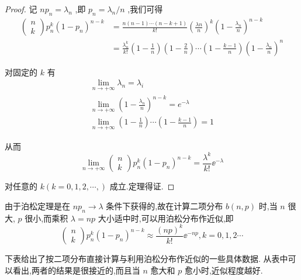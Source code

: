 \begin{proof}
	记 $ n p_{n}=\lambda_{n} $ ,即 $ p_{n}=\lambda_{n} / n $ ,我们可得
	\[
	\begin{array}{ll}
	{\left( 
		\begin{array}{l}
		{n} \\ 
		{k}
		\end{array}
		\right) p_{n}^{k}\left(1-p_{n}\right)^{n-k}} & {=\frac{n(n-1) \cdots(n-k+1)}{k !}
		\left(\frac{\lambda n}{n}\right)^{k}
		\left(1-\frac{\lambda_{n}}{n}\right)^{n-k}} \\
	{} & {=\frac{\lambda_{n}^{k}}{k !}
		\left(1-\frac{1}{n}\right)
		\left(1-\frac{2}{n}\right)
		\cdots
		\left(1-\frac{k-1}{n}\right)
		\left(1-\frac{\lambda_{n}}{n}\right)^{n}}
	\end{array}
	\]
	
	对固定的 $ k $ 有
	\[
	\begin{array}{l}{\lim _{n \rightarrow+\infty} \lambda_{n}=\lambda_{i}} \\ {\lim _{n \rightarrow+\infty}\left(1-\frac{\lambda_{n}}{n}\right)^{n-k}=e^{-\lambda}} \\ {\lim _{n \rightarrow+\infty}\left(1-\frac{1}{n}\right) \cdots\left(1-\frac{k-1}{n}\right)=1}\end{array}
	\]
	
	从而
	\[
	\lim _{n \rightarrow+\infty} \left( \begin{array}{l}{n} \\ {k}\end{array}\right) p_{n}^{k}\left(1-p_{n}\right)^{n-k}=\frac{\lambda^{k}}{k !} \ee ^{-\lambda}
	\]
	
	对任意的 $ k(k=0,1,2, \cdots,) $ 成立.定理得证.
	
\end{proof}

由于泊松定理是在 $ n p_{n} \rightarrow \lambda $ 条件下获得的,故在计算二项分布 $ b(n,p) $ 时,当 $ n $ 很大, $ p $ 很小,而乘积 $ \lambda=n p $ 大小适中时,可以用泊松分布作近似,即
\begin{equation}
\left( \begin{array}{l}{n} \\ {k}\end{array}\right) p_{n}^{k}\left(1-p_{n}\right)^{n-k} \approx \frac{(n p)^{k}}{k !} \ee ^{-n p}, k=0,1,2 \cdots \label{eq:2.4.5}
\end{equation}

下表给出了按二项分布直接计算与利用泊松分布作近似的一些具体数据.
从表中可以看出,两者的结果是很接近的,而且当 $ n $ 愈大和 $ p $ 愈小时,近似程度越好.

